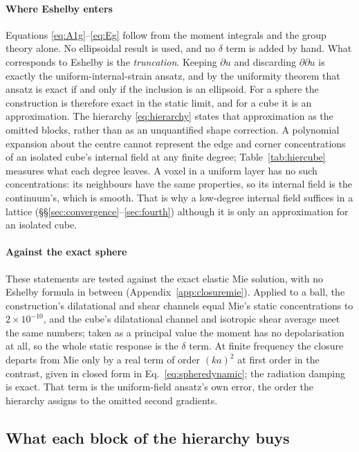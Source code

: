 \documentclass[preprint,review,12pt]{elsarticle}
\begin{document}
\paragraph{Where Eshelby enters} Equations \eqref{eq:A1g}--\eqref{eq:Eg} follow from the moment
integrals and the group theory alone. No ellipsoidal result is used, and no $\delta$ term is added
by hand. What corresponds to Eshelby is the \emph{truncation}. Keeping $\partial u$ and discarding
$\partial\partial u$ is exactly the uniform-internal-strain ansatz, and by the uniformity theorem
that ansatz is exact if and only if the inclusion is an ellipsoid. For a sphere the construction
is therefore exact in the static limit, and for a cube it is an approximation. The hierarchy
\eqref{eq:hierarchy} states that approximation as the omitted blocks, rather than as an
unquantified shape correction. A polynomial expansion about the centre cannot represent the edge
and corner concentrations of an isolated cube's internal field at any finite degree;
Table~\ref{tab:hiercube} measures what each degree leaves. A voxel in a
uniform layer has no such concentrations: its neighbours have the same properties, so its internal
field is the continuum's, which is smooth. That is why a low-degree internal field suffices in a
lattice (\S\S\ref{sec:convergence}--\ref{sec:fourth}) although it is only an approximation for an
isolated cube.

\paragraph{Against the exact sphere} These statements are tested against the exact elastic Mie
solution, with no Eshelby formula in between (Appendix~\ref{app:closuremie}). Applied to a ball, the
construction's dilatational and shear channels equal Mie's static concentrations to $2\times10^{-10}$,
and the cube's dilatational channel and isotropic shear average meet the same numbers; taken as a
principal value the moment has no depolarisation at all, so the whole static response is the
$\delta$ term. At finite frequency the closure departs from Mie only by a real term of order $(ka)^2$
at first order in the contrast, given in closed form in Eq.~\eqref{eq:spheredynamic}; the radiation
damping is exact. That term is the uniform-field ansatz's own error, the order the hierarchy assigns
to the omitted second gradients.

\subsection{What each block of the hierarchy buys}\label{sec:blocks}
\end{document}

